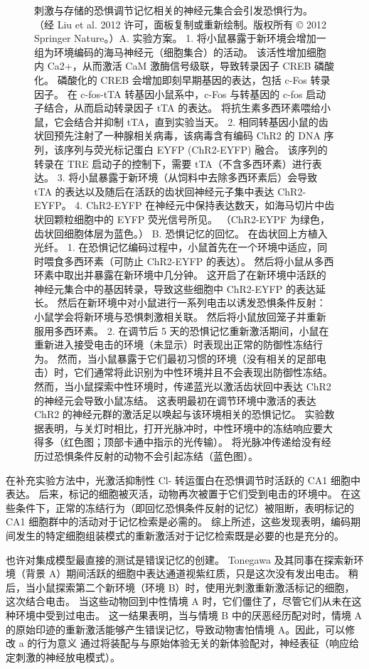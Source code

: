 \begin{figure}[htbp]
	\caption{刺激与存储的恐惧调节记忆相关的神经元集合会引发恐惧行为。 （经 Liu et al. 2012 许可，面板复制或重新绘制。版权所有 © 2012 Springer Nature。）A. 实验方案。 1. 将小鼠暴露于新环境会增加一组为环境编码的海马神经元（细胞集合）的活动。 该活性增加细胞内 Ca2+，从而激活 CaM 激酶信号级联，导致转录因子 CREB 磷酸化。 磷酸化的 CREB 会增加即刻早期基因的表达，包括 c-Fos 转录因子。 在 c-fos-tTA 转基因小鼠系中，c-Fos 与转基因的 c-fos 启动子结合，从而启动转录因子 tTA 的表达。 将抗生素多西环素喂给小鼠，它会结合并抑制 tTA，直到实验当天。 2. 相同转基因小鼠的齿状回预先注射了一种腺相关病毒，该病毒含有编码 ChR2 的 DNA 序列，该序列与荧光标记蛋白 EYFP (ChR2-EYFP) 融合。 该序列的转录在 TRE 启动子的控制下，需要 tTA（不含多西环素）进行表达。 3. 将小鼠暴露于新环境（从饲料中去除多西环素后）会导致 tTA 的表达以及随后在活跃的齿状回神经元子集中表达 ChR2-EYFP。 4. ChR2-EYFP 在神经元中保持表达数天，如海马切片中齿状回颗粒细胞中的 EYFP 荧光信号所见。 （ChR2-EYPF 为绿色，齿状回细胞体层为蓝色。） B. 恐惧记忆的回忆。 在齿状回上方植入光纤。 1. 在恐惧记忆编码过程中，小鼠首先在一个环境中适应，同时喂食多西环素（可防止 ChR2-EYFP 的表达）。 然后将小鼠从多西环素中取出并暴露在新环境中几分钟。 这开启了在新环境中活跃的神经元集合中的基因转录，导致这些细胞中 ChR2-EYFP 的表达延长。 然后在新环境中对小鼠进行一系列电击以诱发恐惧条件反射：小鼠学会将新环境与恐惧刺激相关联。 然后将小鼠放回笼子并重新服用多西环素。 2. 在调节后 5 天的恐惧记忆重新激活期间，小鼠在重新进入接受电击的环境（未显示）时表现出正常的防御性冻结行为。 然而，当小鼠暴露于它们最初习惯的环境（没有相关的足部电击）时，它们通常将此识别为中性环境并且不会表现出防御性冻结。 然而，当小鼠探索中性环境时，传递蓝光以激活齿状回中表达 ChR2 的神经元会导致小鼠冻结。 这表明最初在调节环境中激活的表达 ChR2 的神经元群的激活足以唤起与该环境相关的恐惧记忆。 实验数据表明，与关灯时相比，打开光脉冲时，中性环境中的冻结响应要大得多（红色图；顶部卡通中指示的光传输）。 将光脉冲传递给没有经历过恐惧条件反射的动物不会引起冻结（蓝色图）。}
	\label{fig:54_11}
\end{figure}

在补充实验方法中，光激活抑制性 Cl- 转运蛋白在恐惧调节时活跃的 CA1 细胞中表达。 后来，标记的细胞被灭活，动物再次被置于它们受到电击的环境中。 在这些条件下，正常的冻结行为（即回忆恐惧条件反射的记忆）被阻断，表明标记的 CA1 细胞群中的活动对于记忆检索是必需的。 综上所述，这些发现表明，编码期间发生的特定细胞组装模式的重新激活对于记忆检索既是必要的也是充分的。

也许对集成模型最直接的测试是错误记忆的创建。 Tonegawa 及其同事在探索新环境（背景 A）期间活跃的细胞中表达通道视紫红质，只是这次没有发出电击。 稍后，当小鼠探索第二个新环境（环境 B）时，使用光刺激重新激活标记的细胞，这次结合电击。 当这些动物回到中性情境 A 时，它们僵住了，尽管它们从未在这种环境中受到过电击。 这一结果表明，当与情境 B 中的厌恶经历配对时，情境 A 的原始印迹的重新激活能够产生错误记忆，导致动物害怕情境 A。因此，可以修改 a 的行为意义 通过将装配与与原始体验无关的新体验配对，神经表征（响应给定刺激的神经放电模式）。

